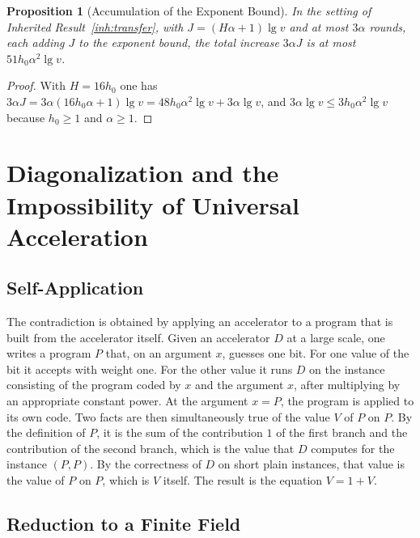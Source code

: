 \documentclass[11pt,letterpaper]{report}
\theoremstyle{plain}
\newtheorem{proposition}[theorem]{Proposition}
\theoremstyle{definition}
\theoremstyle{remark}
\begin{document}
\begin{proposition}[Accumulation of the Exponent Bound]\label{pr:expbound}
In the setting of Inherited Result~\ref{inh:transfer}, with $J=(H\alpha+1)\lg v$ and at most $3\alpha$ rounds, each adding $J$ to the exponent bound, the total increase $3\alpha J$ is at most $51h_0\alpha^2\lg v$.
\end{proposition}
\begin{proof}
With $H=16h_0$ one has $3\alpha J=3\alpha(16h_0\alpha+1)\lg v=48h_0\alpha^2\lg v+3\alpha\lg v$, and $3\alpha\lg v\le3h_0\alpha^2\lg v$ because $h_0\ge1$ and $\alpha\ge1$.
\end{proof}

\chapter{Diagonalization and the Impossibility of Universal Acceleration}

\section{Self-Application}

The contradiction is obtained by applying an accelerator to a program that is built from the accelerator itself. Given an accelerator $D$ at a large scale, one writes a program $P$ that, on an argument $x$, guesses one bit. For one value of the bit it accepts with weight one. For the other value it runs $D$ on the instance consisting of the program coded by $x$ and the argument $x$, after multiplying by an appropriate constant power. At the argument $x=P$, the program is applied to its own code. Two facts are then simultaneously true of the value $V$ of $P$ on $P$. By the definition of $P$, it is the sum of the contribution $1$ of the first branch and the contribution of the second branch, which is the value that $D$ computes for the instance $(P,P)$. By the correctness of $D$ on short plain instances, that value is the value of $P$ on $P$, which is $V$ itself. The result is the equation $V=1+V$.

\section{Reduction to a Finite Field}
\end{document}
